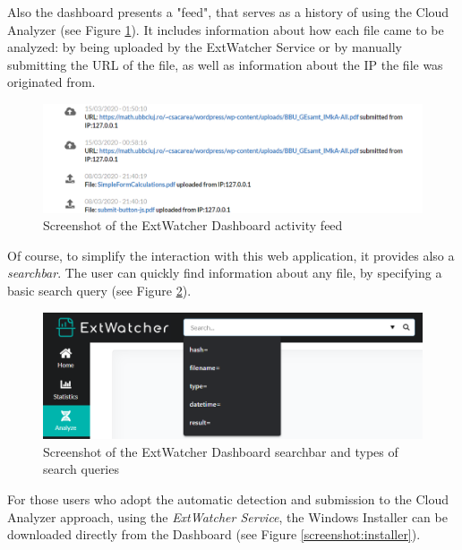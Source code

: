 Also the dashboard presents a "feed", that serves as a history of using the Cloud Analyzer (see Figure \ref{screenshot:feed}). It includes information about how each file came to be analyzed: by being uploaded by the ExtWatcher Service or by manually submitting the URL of the file, as well as information about the IP the file was originated from.

\begin{figure}[H]
	\centerline{\includegraphics[scale=0.6]{figures/feed.png}}  
	\caption{Screenshot of the ExtWatcher Dashboard activity feed}
	\label{screenshot:feed}
\end{figure}

Of course, to simplify the interaction with this web application, it provides also a \textit{searchbar}. The user can quickly find information about any file, by specifying a basic search query (see Figure \ref{screenshot:searchbar}).

\begin{figure}[H]
	\centerline{\includegraphics[scale=0.6]{figures/searchbar.png}}  
	\caption{Screenshot of the ExtWatcher Dashboard searchbar and types of search queries}
	\label{screenshot:searchbar}
\end{figure}

For those users who adopt the automatic detection and submission to the Cloud Analyzer approach, using the \textit{ExtWatcher Service}, the Windows Installer can be downloaded directly from the Dashboard (see Figure \ref{screenshot:installer}). 

